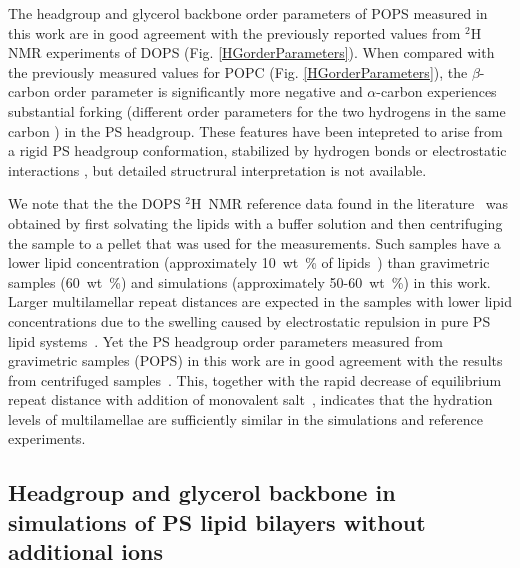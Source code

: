 \documentclass[aps,prl,superscriptaddress,twocolumn]{revtex4}
\begin{document}
The headgroup and glycerol backbone order parameters of 
POPS measured in this work are in good agreement with the previously reported
values from $^2$H\,NMR experiments of DOPS \cite{browning80} (Fig. \ref{HGorderParameters}).
When compared with the previously measured values for POPC \cite{ferreira13} (Fig. \ref{HGorderParameters}),
the $\beta$-carbon order parameter is significantly more negative and $\alpha$-carbon
experiences substantial forking (different order parameters for the two hydrogens in the same carbon \cite{ollila16}) in the PS headgroup.
These features have been intepreted to arise from a rigid PS headgroup
conformation, stabilized by hydrogen bonds or electrostatic
interactions \cite{browning80,buldt81}, but detailed structrural interpretation is not
available. 

We note that the the DOPS $^2$H~NMR reference data found in the literature~\cite{browning80,roux90} was obtained by first solvating
the lipids with a buffer solution and then centrifuging the sample to a pellet that was used for the measurements. Such samples have a lower lipid concentration
(approximately 10~wt~\% of lipids~\cite{browning80,roux88,roux90}) than 
gravimetric samples (60~wt~\%) and simulations (approximately 50-60~wt~\%) in this work.
Larger multilamellar repeat distances are expected in the samples with lower lipid
concentrations due to the swelling caused by electrostatic repulsion in pure PS lipid systems~\cite{millman82}.
Yet the PS headgroup order parameters measured from gravimetric samples (POPS) in this work
are in good agreement with the results from centrifuged samples~\cite{browning80}. This, together with the rapid decrease of equilibrium repeat distance with addition of monovalent salt~\cite{millman82,rand89}, indicates that the hydration levels of multilamellae are sufficiently similar in the simulations and reference experiments.


\subsection{Headgroup and glycerol backbone in simulations of PS lipid bilayers without additional ions}
\end{document}
